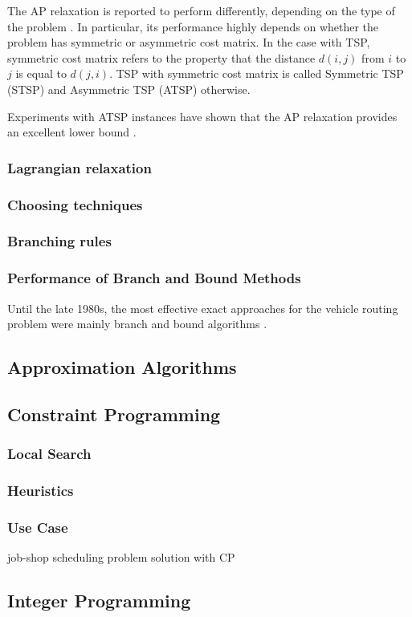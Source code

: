 \documentclass{article}
\theoremstyle{definition}
\begin{document}

The AP relaxation is reported to perform differently, depending on the type of the problem \citep{tspbible,Bellmore71}. In particular, its performance highly depends on whether the problem has symmetric or asymmetric cost matrix. In the case with TSP, symmetric cost matrix refers to the property that the distance $d(i,j)$ from $i$ to $j$ is equal to $d(j,i)$. TSP with symmetric cost matrix is called Symmetric TSP (STSP) and Asymmetric TSP (ATSP) otherwise.

Experiments with ATSP instances have shown that the AP relaxation provides an excellent lower bound \citep{tspbible}. 

\subsubsection{Lagrangian relaxation}

\subsubsection{Choosing techniques}

\subsubsection{Branching rules}


\subsubsection{Performance of Branch and Bound Methods}
Until the late 1980s, the most effective exact approaches for the vehicle routing problem were mainly branch and bound algorithms \citep{vrpbible}.

\subsection{Approximation Algorithms}
\label{approxalgos}

\subsection{Constraint Programming}
\label{cp}
\subsubsection{Local Search}
\subsubsection{Heuristics}
\subsubsection{Use Case}
job-shop scheduling problem solution with CP

\subsection{Integer Programming}
\label{ip}




\end{document}
